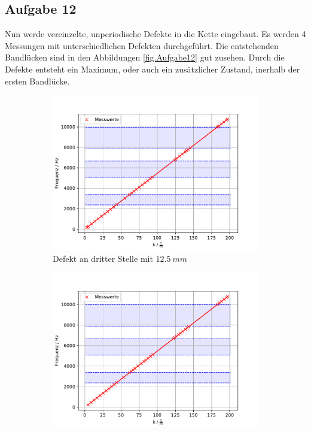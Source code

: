 \subsection{Aufgabe 12}
Nun werde vereinzelte, unperiodische Defekte in die Kette eingebaut.
Es werden 4 Messungen mit unterschiedlichen Defekten durchgeführt.
Die entstehenden Bandlücken sind in den Abbildungen \ref{fig.Aufgabe12} gut zusehen.
Durch die Defekte entsteht ein Maximum, oder auch ein zusätzlicher Zustand, inerhalb der ersten Bandlücke.


  \begin{figure}
   \centering
   \begin{subfigure}{0.48\textwidth}
    \centering
    \includegraphics[width=1.1\textwidth]{max.pdf}
    \caption{Defekt an dritter Stelle mit $\SI{12.5}{mm}$}
    \label{fig.Aufgabe121}
   \end{subfigure}
   \begin{subfigure}{0.48\textwidth}
    \centering
    \includegraphics[width=1.1\textwidth]{max2.pdf}

\end{subfigure}
\end{figure}
